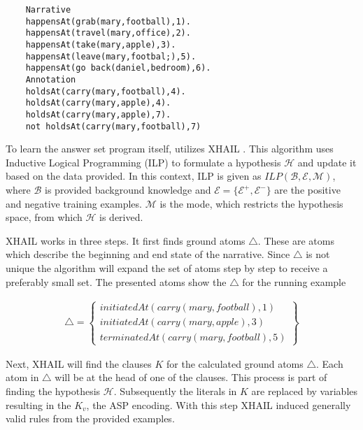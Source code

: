 \documentclass[runningheads]{llncs}
\begin{document}
\begin{verbatim}
    Narrative
    happensAt(grab(mary,football),1).
    happensAt(travel(mary,office),2).
    happensAt(take(mary,apple),3).
    happensAt(leave(mary,footbal;),5).
    happensAt(go back(daniel,bedroom),6).
    Annotation
    holdsAt(carry(mary,football),4).
    holdsAt(carry(mary,apple),4).
    holdsAt(carry(mary,apple),7).
    not holdsAt(carry(mary,football),7)
\end{verbatim}  
        
        
        
To learn the answer set program itself, \cite{mitra2016addressing} utilizes XHAIL \cite{ray2009nonmonotonic}. This algorithm uses Inductive Logical Programming (ILP) to formulate a hypothesis $\mathcal{H}$ and update it based on the data provided. In this context, ILP is given as  $ILP(\mathcal{B},\mathcal{E},\mathcal{M})$, where $\mathcal{B}$ is provided background knowledge and $\mathcal{E} = \{\mathcal{E}^+, \mathcal{E}^-\}$ are the positive and negative training examples. $\mathcal{M}$ is the mode, which restricts the hypothesis space, from which $\mathcal{H}$ is derived.  



 
 

XHAIL works in three steps. It first finds ground atoms $\triangle$. These are atoms which describe the beginning and end state of the narrative. Since $\triangle$ is not unique the algorithm will expand the set of atoms step by step to receive a preferably small set. The presented atoms show the $\triangle$ for the running example

    \begin{align*}
        \triangle = 
        \left\{ 
        \begin{matrix}{initiatedAt(carry(mary, football), 1)} \\ 
        {initiatedAt(carry(mary, apple), 3)} \\ 
        {terminatedAt(carry(mary, football), 5)} 
        \end{matrix}\right\}
    \end{align*}
        
        
Next, XHAIL will find the clauses $K$ for the calculated ground atoms $\triangle$. Each atom in $\triangle$ will be at the head of one of the clauses. This process is part of finding the hypothesis $\mathcal{H}$. Subsequently the literals in $K$ are replaced by variables resulting in the $K_v$, the ASP encoding. With this step XHAIL  induced generally valid rules from the provided examples.  
\end{document}
